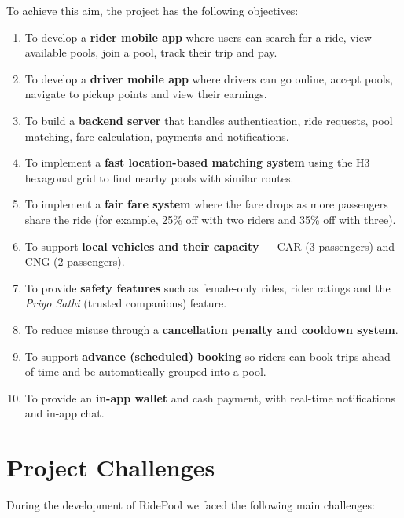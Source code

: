 To achieve this aim, the project has the following objectives:

\begin{enumerate}
  \item To develop a \textbf{rider mobile app} where users can search for a
        ride, view available pools, join a pool, track their trip and pay.
  \item To develop a \textbf{driver mobile app} where drivers can go online,
        accept pools, navigate to pickup points and view their earnings.
  \item To build a \textbf{backend server} that handles authentication, ride
        requests, pool matching, fare calculation, payments and notifications.
  \item To implement a \textbf{fast location-based matching system} using the
        H3 hexagonal grid to find nearby pools with similar routes.
  \item To implement a \textbf{fair fare system} where the fare drops as more
        passengers share the ride (for example, 25\% off with two riders and
        35\% off with three).
  \item To support \textbf{local vehicles and their capacity} --- CAR
        (3 passengers) and CNG (2 passengers).
  \item To provide \textbf{safety features} such as female-only rides, rider
        ratings and the \textit{Priyo Sathi} (trusted companions) feature.
  \item To reduce misuse through a \textbf{cancellation penalty and cooldown
        system}.
  \item To support \textbf{advance (scheduled) booking} so riders can book
        trips ahead of time and be automatically grouped into a pool.
  \item To provide an \textbf{in-app wallet} and cash payment, with real-time
        notifications and in-app chat.
\end{enumerate}

\section{Project Challenges}
\label{sec:challenges}

During the development of RidePool we faced the following main challenges:

